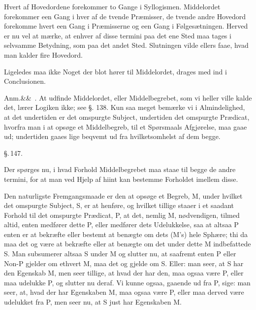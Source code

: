 \documentclass[12pt]{book}
\def\sperr#1{#1}%
\def\textit#1{#1}%
\def\emph#1{#1}%
\newcommand{\sperr}[1]{\textls[180]{#1}}
\newcommand{\parag}[1]{%
  \par\vspace{0.9\baselineskip}%
  {\centering\textit{\S.\,#1.}\par}%
  \vspace{0.35\baselineskip}%
  \noindent\hspace{\parindent}\ignorespaces
}
\newcommand{\anm}[1]{%
  \par\vspace{0.5\baselineskip}%
  \noindent\hspace{\parindent}\sperr{Anm.}\ifx&#1&\else~\textit{#1}.\fi
  \enspace\ignorespaces
}
\newcommand{\opage}[1]{\marginnote{\footnotesize\textit{[#1]}}}
\begin{document}
Hvert af Hovedordene forekommer to Gange i Syllogismen. Middelordet
forekommer een Gang i hver af de tvende Præmisser, de tvende andre Hovedord
forekomme hvert een Gang i Præmisserne og een Gang i Følgesætningen. Herved er
nu vel at mærke, at enhver af disse \textit{termini} paa det ene Sted maa tages
i selvsamme Betydning, som paa det andet Sted. Slutningen vilde ellers faae,
hvad man kalder fire Hovedord.

\emph{Ligeledes maa ikke Noget der blot hører til Middelordet, drages med ind i
Conclusionen.}

\anm{} At udfinde Middelordet, eller Middelbegrebet, som vi heller ville kalde
det, lærer Logiken ikke; see §. 138. Kun saa meget bemærke vi i Almindelighed,
at det undertiden er det omspurgte Subject, undertiden det omspurgte Prædicat,
hvorfra man i at opsøge et Middelbegreb, til et Spørsmaals Afgjørelse, maa gaae
ud; undertiden gaaes lige beqvemt ud fra hvilketsomhelst af dem begge.

\parag{147}

Der spørges nu, i hvad Forhold Middelbegrebet maa staae til begge de andre
\textit{termini}, for
\opage{337} at man ved Hjelp af hiint kan bestemme Forholdet imellem disse.

Den naturligste Fremgangsmaade er den at opsøge et Begreb, \textit{M}, under
hvilket det omspurgte Subject, \textit{S}, er at henføre, og hvilket tillige
staaer i et saadant Forhold til det omspurgte Prædicat, \textit{P}, at det,
nemlig \textit{M}, nødvendigen, tilmed altid, enten medfører dette \textit{P},
eller medfører dets Udelukkelse, saa at altsaa \textit{P} enten er at bekræfte
eller bestemt at benægte om dets (\textit{M}'s) hele Sphære; thi da maa det og
være at bekræfte eller at benægte om det under dette \textit{M} indbefattede
\textit{S}. Man subsumerer altsaa \textit{S} under \textit{M} og slutter nu, at
saafremt enten \textit{P} eller \textit{Non-P} gjelder om ethvert \textit{M},
maa det og gjelde om \textit{S}. Eller: man seer, at \textit{S} har den
Egenskab \textit{M}, men seer tillige, at hvad der har den, maa ogsaa være
\textit{P}, eller maa udelukke \textit{P}, og slutter nu deraf. Vi kunne ogsaa,
gaaende ud fra \textit{P}, sige: man seer, at, hvad der har Egenskaben
\textit{M}, maa ogsaa være \textit{P}, eller maa derved være udelukket fra
\textit{P}, men seer nu, at \textit{S} just har Egenskaben \textit{M}.
\end{document}

